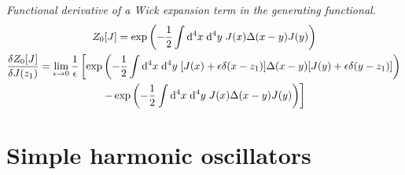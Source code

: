 \documentclass{report}
\begin{document}
\begin{subquests}
	\item \emph{Functional derivative of a Wick expansion term in the generating functional.}
	\begin{gather*}
		Z_0[J] = \exp\pqty{-\frac{1}{2}\int\dd^4{x}\;\dd^4{y}\;J(x)\Delta(x-y)J(y)} \\
		\fdv{Z_0[J]}{J(z_1)} = \lim_{\epsilon \to 0} \frac{1}{\epsilon}\left[\exp\pqty{-\frac{1}{2}\int\dd^4{x}\;\dd^4{y}\;\bqty{J(x) + \epsilon \delta(x - z_1)}\Delta(x-y)\bqty{J(y) + \epsilon \delta(y - z_1)}} \right. \\
		\left. - \exp\pqty{-\frac{1}{2}\int\dd^4{x}\;\dd^4{y}\;J(x)\Delta(x-y)J(y)}\right]
	\end{gather*}
\end{subquests}
	

\chapter{Simple harmonic oscillators}
\end{document}
